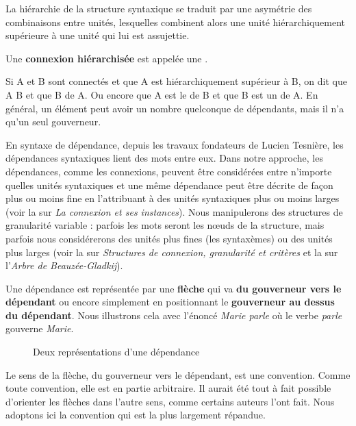 La hiérarchie de la structure syntaxique se traduit par une asymétrie des combinaisons entre unités, lesquelles combinent alors une unité hiérarchiquement supérieure à une unité qui lui est assujettie.

\begin{styleLivreImportant}
Une \textbf{connexion hiérarchisée} est appelée une .
\end{styleLivreImportant}

\begin{styleLivreImportant}
Si A et B sont connectés et que A est hiérarchiquement supérieur à B, on dit que A  B et que B  de A. Ou encore que A est le  de B et que B est un  de A. En général, un élément peut avoir un nombre quelconque de dépendants, mais il n’a qu’un seul gouverneur.
\end{styleLivreImportant}

En syntaxe de dépendance, depuis les travaux fondateurs de Lucien Tesnière, les dépendances syntaxiques lient des mots entre eux. Dans notre approche, les dépendances, comme les connexions, peuvent être considérées entre n’importe quelles unités syntaxiques et une même dépendance peut être décrite de façon plus ou moins fine en l’attribuant à des unités syntaxiques plus ou moins larges (voir la  sur \textit{La connexion et ses instances}). Nous manipulerons des structures de granularité variable : parfois les mots seront les nœuds de la structure, mais parfois nous considérerons des unités plus fines (les syntaxèmes) ou des unités plus larges (voir la  sur \textit{Structures de connexion, granularité et critères} et la  sur l’\textit{Arbre de Beauzée-Gladkij}).

Une dépendance est représentée par une \textbf{flèche} qui va \textbf{du gouverneur vers le dépendant} ou encore simplement en positionnant le \textbf{gouverneur au dessus du dépendant}. Nous illustrons cela avec l’énoncé \textit{Marie parle} où le verbe \textit{parle} gouverne \textit{Marie}.

\begin{figure}

\caption{\label{fig:}Deux représentations d’une dépendance}
\end{figure}

Le sens de la flèche, du gouverneur vers le dépendant, est une convention. Comme toute convention, elle est en partie arbitraire. Il aurait été tout à fait possible d’orienter les flèches dans l’autre sens, comme certains auteurs l’ont fait. Nous adoptons ici la convention qui est la plus largement répandue.


